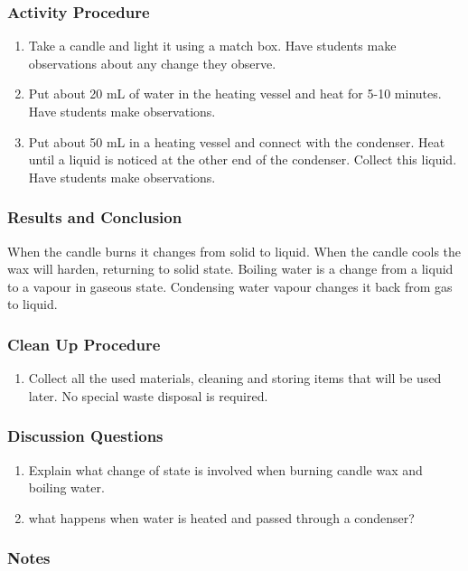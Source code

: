 \subsubsection*{Activity Procedure}
\begin{enumerate}
\item{Take a candle and light it using a match box. Have students make observations about any change they observe.}
\item{Put about 20 mL of water in the heating vessel and heat for 5-10 minutes. Have students make observations.}
\item{Put about 50 mL in a heating vessel and connect with the condenser. Heat until a liquid is noticed at the other end of the condenser. Collect this liquid. Have students make observations.}
\end{enumerate}

\subsubsection*{Results and Conclusion}
When the candle burns it changes from solid to liquid. When the candle cools the wax will harden, returning to solid state.
Boiling water is a change from a liquid to a vapour in gaseous state. Condensing water vapour changes it back from gas to liquid.

\subsubsection*{Clean Up Procedure}
\begin{enumerate}
\item{Collect all the used materials, cleaning and storing items that will be used later. No special waste disposal is required.}
\end{enumerate}

\subsubsection*{Discussion Questions}
\begin{enumerate}
\item{Explain what change of state is involved when burning candle wax and boiling water.}
\item{what happens when water is heated and passed through a condenser?}
\end{enumerate}

\subsubsection*{Notes}

